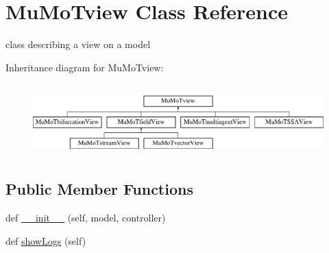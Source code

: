 \hypertarget{class_mu_mo_t_1_1_mu_mo_tview}{}\section{Mu\+Mo\+Tview Class Reference}
\label{class_mu_mo_t_1_1_mu_mo_tview}


class describing a view on a model  


Inheritance diagram for Mu\+Mo\+Tview\+:\begin{figure}[H]
\begin{center}
\leavevmode
\includegraphics[height=2.781457cm]{class_mu_mo_t_1_1_mu_mo_tview}
\end{center}
\end{figure}
\subsection*{Public Member Functions}
\begin{DoxyCompactItemize}
\item 
def \hyperlink{class_mu_mo_t_1_1_mu_mo_tview_a2d1dec64cbd846ffc0fda20aeeae4430}{\+\_\+\+\_\+init\+\_\+\+\_\+} (self, model, controller)
\item 
def \hyperlink{class_mu_mo_t_1_1_mu_mo_tview_aca4d648d909f4722c7e07197675500bb}{show\+Logs} (self)
\end{DoxyCompactItemize}
